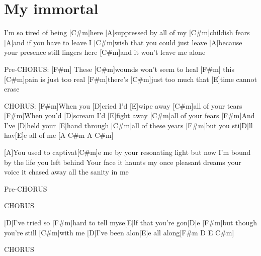 \section{My immortal}
\begin{multicols}{2}
\begin{guitar}
[A]I'm so tired of being [C#m]here
[A]suppressed by all of my [C#m]childish fears
[A]and if you have to leave
I [C#m]wish that you could just leave
[A]because your presence still lingers here
[C#m]and it won't leave me alone


Pre-CHORUS:
[F#m]   These [C#m]wounds won't seem to heal
[F#m]    this [C#m]pain is just too real
[F#m]there's [C#m]just too much that [E]time cannot erase


CHORUS:
[F#m]When you [D]cried I'd [E]wipe away [C#m]all of your tears
[F#m]When you'd [D]scream I'd [E]fight away [C#m]all of your fears
[F#m]And I've [D]held your [E]hand through [C#m]all of these years
[F#m]but you sti[D]ll hav[E]e all of me [A C#m A C#m]


[A]You used to captivat[C#m]e me by your resonating light
but now I'm bound by the life you left behind
Your face it haunts my once pleasant dreams
your voice it chased away all the sanity in me


Pre-CHORUS


CHORUS


[D]I've tried so [F#m]hard to tell myse[E]lf that you're gon[D]e
[F#m]but though you're still [C#m]with me
[D]I've been alon[E]e all along[F#m D E C#m]


CHORUS
\end{guitar}
\end{multicols}
